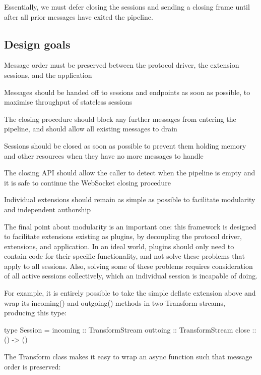 Essentially, we must defer closing the sessions and sending a closing frame until after all prior messages have exited the pipeline.

\subsection*{Design goals}


\begin{DoxyItemize}
\item Message order must be preserved between the protocol driver, the extension sessions, and the application
\item Messages should be handed off to sessions and endpoints as soon as possible, to maximise throughput of stateless sessions
\item The closing procedure should block any further messages from entering the pipeline, and should allow all existing messages to drain
\item Sessions should be closed as soon as possible to prevent them holding memory and other resources when they have no more messages to handle
\item The closing A\+PI should allow the caller to detect when the pipeline is empty and it is safe to continue the Web\+Socket closing procedure
\item Individual extensions should remain as simple as possible to facilitate modularity and independent authorship
\end{DoxyItemize}

The final point about modularity is an important one\+: this framework is designed to facilitate extensions existing as plugins, by decoupling the protocol driver, extensions, and application. In an ideal world, plugins should only need to contain code for their specific functionality, and not solve these problems that apply to all sessions. Also, solving some of these problems requires consideration of all active sessions collectively, which an individual session is incapable of doing.

For example, it is entirely possible to take the simple {\ttfamily deflate} extension above and wrap its {\ttfamily incoming()} and {\ttfamily outgoing()} methods in two {\ttfamily Transform} streams, producing this type\+: \begin{DoxyVerb}type Session = {
  incoming :: TransformStream
  outtoing :: TransformStream
  close    :: () -> ()
}
\end{DoxyVerb}


The {\ttfamily Transform} class makes it easy to wrap an async function such that message order is preserved\+:


